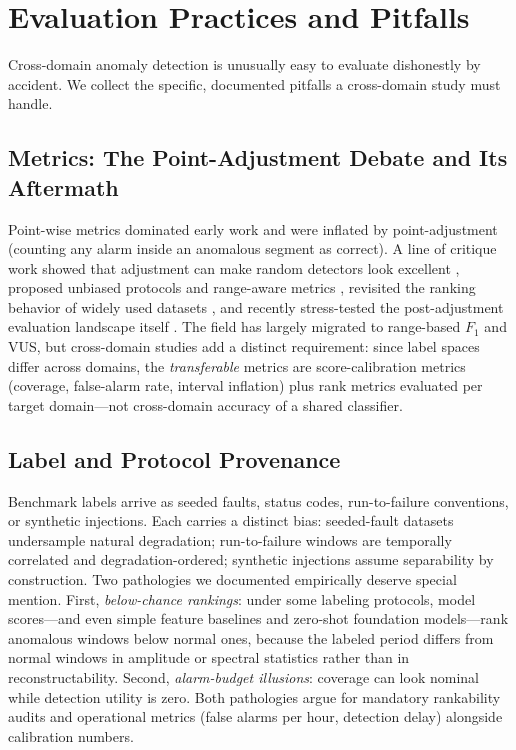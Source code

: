 \section{Evaluation Practices and Pitfalls}
\label{sec:evaluation}

Cross-domain anomaly detection is unusually easy to evaluate dishonestly by accident. We collect the specific, documented pitfalls a cross-domain study must handle.

\subsection{Metrics: The Point-Adjustment Debate and Its Aftermath}
Point-wise metrics dominated early work and were inflated by point-adjustment (counting any alarm inside an anomalous segment as correct). A line of critique work showed that adjustment can make random detectors look excellent \cite{2109_05257,2308_13068}, proposed unbiased protocols and range-aware metrics \cite{2405_12096,2305_09691}, revisited the ranking behavior of widely used datasets \cite{2603_18985}, and recently stress-tested the post-adjustment evaluation landscape itself \cite{2607_11969}. The field has largely migrated to range-based $F_1$ and VUS, but cross-domain studies add a distinct requirement: since label spaces differ across domains, the \emph{transferable} metrics are score-calibration metrics (coverage, false-alarm rate, interval inflation) plus rank metrics evaluated per target domain---not cross-domain accuracy of a shared classifier.

\subsection{Label and Protocol Provenance}
Benchmark labels arrive as seeded faults, status codes, run-to-failure conventions, or synthetic injections. Each carries a distinct bias: seeded-fault datasets undersample natural degradation; run-to-failure windows are temporally correlated and degradation-ordered; synthetic injections assume separability by construction. Two pathologies we documented empirically \cite{our_scc} deserve special mention. First, \emph{below-chance rankings}: under some labeling protocols, model scores---and even simple feature baselines and zero-shot foundation models---rank anomalous windows below normal ones, because the labeled period differs from normal windows in amplitude or spectral statistics rather than in reconstructability. Second, \emph{alarm-budget illusions}: coverage can look nominal while detection utility is zero. Both pathologies argue for mandatory rankability audits and operational metrics (false alarms per hour, detection delay) alongside calibration numbers.


